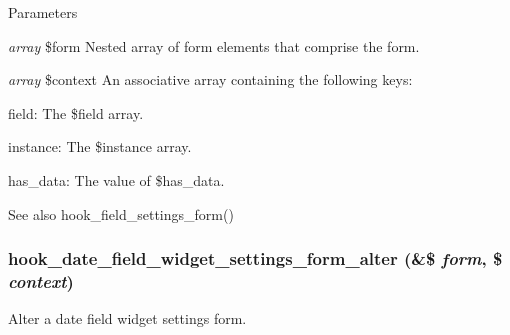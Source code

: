 \begin{DoxyParams}{Parameters}
\item[{\em array}]\$form Nested array of form elements that comprise the form. \item[{\em array}]\$context An associative array containing the following keys:
\begin{DoxyItemize}
\item field: The \$field array.
\item instance: The \$instance array.
\item has\_\-data: The value of \$has\_\-data.
\end{DoxyItemize}\end{DoxyParams}
\begin{DoxySeeAlso}{See also}
hook\_\-field\_\-settings\_\-form() 
\end{DoxySeeAlso}
\hypertarget{date_8api_8php_a0c2475c846f8750a83b95ea852bf42cf}{
\subsubsection[{hook\_\-date\_\-field\_\-widget\_\-settings\_\-form\_\-alter}]{\setlength{\rightskip}{0pt plus 5cm}hook\_\-date\_\-field\_\-widget\_\-settings\_\-form\_\-alter (\&\$ {\em form}, \/  \$ {\em context})}}
\label{date_8api_8php_a0c2475c846f8750a83b95ea852bf42cf}
Alter a date field widget settings form.


